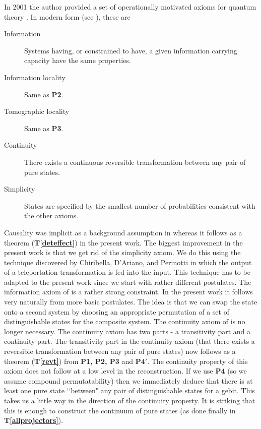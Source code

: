 \documentclass[10pt]{article}
\begin{document}
In 2001 the author provided a set of operationally motivated axioms for quantum theory \cite{hardy2001quantum}.  In modern form (see \cite{hardy2009foliable}), these are
\begin{description}
\item[Information] Systems having, or constrained to have, a given information carrying
capacity have the same properties.
\item[Information locality] Same as {\bf P2}.
\item[Tomographic locality] Same as {\bf P3}.
\item[Continuity] There exists a continuous reversible transformation between any
pair of pure states.
\item[Simplicity] States are specified by the smallest number of probabilities consistent
with the other axioms.
\end{description}
Causality was implicit as a background assumption in \cite{hardy2001quantum} whereas it follows as a theorem ({\bf T\ref{deteffect}}) in the present work.  The biggest improvement in the present work is that we get rid of the simplicity axiom.  We do this using the technique discovered by Chiribella, D'Ariano, and Perinotti \cite{chiribella2010probabilistic, chiribella2010informational} in which the output of a teleportation transformation is fed into the input. This technique has to be adapted to the present work since we start with rather different postulates.  The information axiom of \cite{hardy2001quantum} is a rather strong constraint.  In the present work it follows very naturally from more basic postulates.  The idea is that we can swap the state onto a second system by choosing an appropriate permutation of a set of distinguishable states for the composite system.   The continuity axiom of \cite{hardy2001quantum} is no longer necessary.  The continuity axiom has two parts - a transitivity part and a continuity part.  The transitivity part in the continuity axiom (that there exists a reversible transformation between any pair of pure states) now follows as a theorem ({\bf T\ref{revt}}) from {\bf P1, P2, P3} and {\bf P4}$'$.  The continuity property of this axiom does not follow at a low level in the reconstruction.  If we use {\bf P4} (so we assume compound permutatability) then we immediately deduce that there is at least one pure state \lq\lq between" any pair of distinguishable states for a gebit.  This takes us a little way in the direction of the continuity property. It is striking that this is enough to construct the continuum of pure states (as done finally in {\bf T\ref{allprojectors}}).
\end{document}
